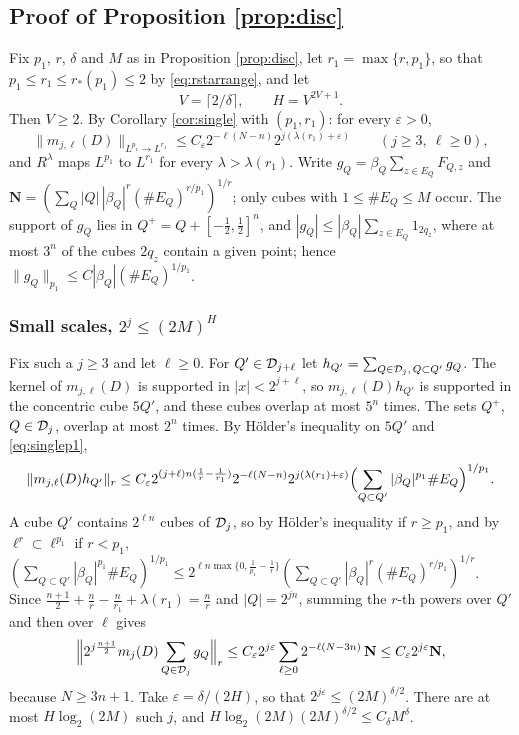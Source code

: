 \subsection{Proof of Proposition \ref{prop:disc}}\label{ssec:proofdisc}
Fix $p_1$, $r$, $\delta$ and $M$ as in Proposition \ref{prop:disc}, let $r_1=\max\{r,p_1\}$, so that
$p_1\le r_1\le r_*(p_1)\le2$ by \eqref{eq:rstarrange}, and let
\[
V=\lceil2/\delta\rceil,\qquad H=V^{2V+1}.
\]
Then $V\ge2$. By Corollary \ref{cor:single} with $(p_1,r_1)$: for every $\varepsilon>0$,
\begin{equation}\label{eq:singlep1}
\|m_{j,\ell}(D)\|_{L^{p_1}\to L^{r_1}}\le C_\varepsilon2^{-\ell(N-n)}2^{j(\lambda(r_1)+\varepsilon)}\qquad(j\ge3,\ \ell\ge0),
\end{equation}
and $R^\lambda$ maps $L^{p_1}$ to $L^{r_1}$ for every $\lambda>\lambda(r_1)$. Write $g_Q=\beta_Q\sum_{z\in E_Q}F_{Q,z}$ and
$\mathbf N=(\sum_Q|Q|\,|\beta_Q|^r(\#E_Q)^{r/p_1})^{1/r}$; only cubes with $1\le\#E_Q\le M$ occur. The support of
$g_Q$ lies in $Q^+=Q+[-\frac12,\frac12]^n$, and $|g_Q|\le|\beta_Q|\sum_{z\in E_Q}1_{2q_z}$, where at most $3^n$ of the cubes
$2q_z$ contain a given point; hence $\|g_Q\|_{p_1}\le C|\beta_Q|(\#E_Q)^{1/p_1}$.

\subsubsection*{Small scales, $2^j\le(2M)^H$}
Fix such a $j\ge3$ and let $\ell\ge0$. For $Q'\in\mathcal D_{j+\ell}$ let $h_{Q'}=\sum_{Q\in\mathcal D_j,\,Q\subset Q'}g_Q$. The kernel of
$m_{j,\ell}(D)$ is supported in $|x|<2^{j+\ell}$, so $m_{j,\ell}(D)h_{Q'}$ is supported in the concentric cube $5Q'$,
and these cubes overlap at most $5^n$ times. The sets $Q^+$, $Q\in\mathcal D_j$, overlap at most $2^n$ times. By
H\"older's inequality on $5Q'$ and \eqref{eq:singlep1},
\[
\|m_{j,\ell}(D)h_{Q'}\|_r\le C_\varepsilon2^{(j+\ell)n(\frac1r-\frac1{r_1})}2^{-\ell(N-n)}2^{j(\lambda(r_1)+\varepsilon)}
\Bigl(\sum_{Q\subset Q'}|\beta_Q|^{p_1}\#E_Q\Bigr)^{1/p_1} .
\]
A cube $Q'$ contains $2^{\ell n}$ cubes of $\mathcal D_j$, so by H\"older's inequality if $r\ge p_1$, and by
$\ell^r\subset\ell^{p_1}$ if $r<p_1$,
$(\sum_{Q\subset Q'}|\beta_Q|^{p_1}\#E_Q)^{1/p_1}\le2^{\ell n\max\{0,\frac1{p_1}-\frac1r\}}(\sum_{Q\subset Q'}|\beta_Q|^r(\#E_Q)^{r/p_1})^{1/r}$.
Since $\frac{n+1}2+\frac nr-\frac n{r_1}+\lambda(r_1)=\frac nr$ and $|Q|=2^{jn}$, summing the $r$-th powers over $Q'$ and
then over $\ell$ gives
\[
\Bigl\|2^{j\frac{n+1}2}m_j(D)\sum_{Q\in\mathcal D_j}g_Q\Bigr\|_r\le C_\varepsilon2^{j\varepsilon}\sum_{\ell\ge0}2^{-\ell(N-3n)}\,\mathbf N
\le C_\varepsilon2^{j\varepsilon}\mathbf N,
\]
because $N\ge3n+1$. Take $\varepsilon=\delta/(2H)$, so that $2^{j\varepsilon}\le(2M)^{\delta/2}$. There are at most
$H\log_2(2M)$ such $j$, and $H\log_2(2M)(2M)^{\delta/2}\le C_\delta M^\delta$.

